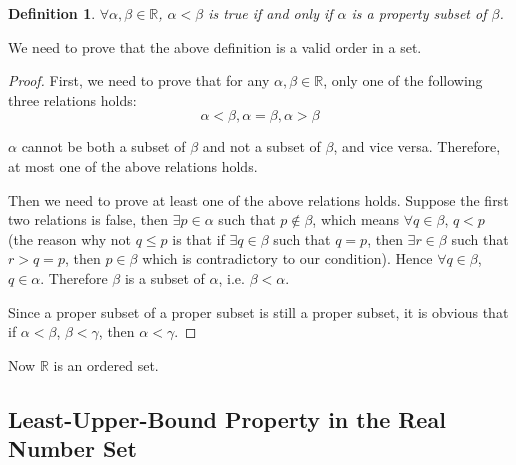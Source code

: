 \documentclass[onecolumn]{article}
\newtheorem{definition}{Definition}
\begin{document}
\begin{definition}
  $\forall \alpha, \beta \in \mathbb{R}$, $\alpha < \beta$ is true if and only 
  if $\alpha$ is a property subset of $\beta$.
\end{definition}
We need to prove that the above definition is a valid order in a set.
\begin{proof}
  First, we need to prove that for any $\alpha, \beta \in \mathbb{R}$, only one 
  of the following three relations holds:
  \[
    \alpha < \beta, \alpha = \beta, \alpha > \beta
  \]

  $\alpha$ cannot be both a subset of $\beta$ and not a subset of $\beta$, and 
  vice versa. Therefore, at most one of the above relations holds.

  Then we need to prove at least one of the above relations holds. Suppose the 
  first two relations is false, then $\exists p \in \alpha$ such that 
  $p \notin \beta$, which means $\forall q \in \beta$, $q < p$ (the reason why 
  not $q \leq p$ is that if $\exists q \in \beta$ such that $q = p$, then 
  $\exists r \in \beta$ such that $r > q = p$, then $p \in \beta$ which is 
  contradictory to our condition). Hence $\forall q \in \beta$, $q \in \alpha$. 
  Therefore $\beta$ is a subset of $\alpha$, i.e. $\beta < \alpha$.

  Since a proper subset of a proper subset is still a proper subset, it is 
  obvious that if $\alpha < \beta$, $\beta < \gamma$, then $\alpha < \gamma$.
\end{proof}

Now $\mathbb{R}$ is an ordered set.

\subsection{Least-Upper-Bound Property in the Real Number Set}
\end{document}
